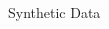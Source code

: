 \documentclass[mathserif]{beamer}
\begin{document}
\begin{frame}{Synthetic Data}
\begin{columns}
\begin{column}{0.7\textwidth}
%

\end{column}
\end{columns}
\end{frame}
\end{document}
